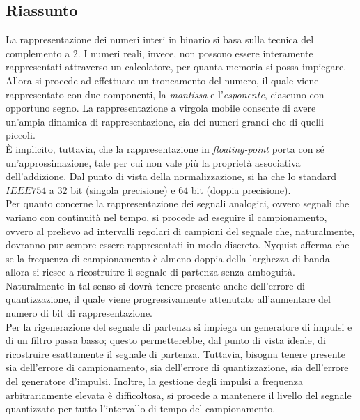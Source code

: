 \documentclass[a4paper]{extarticle}
\begin{document}
\subsection{Riassunto}
La rappresentazione dei numeri interi in binario si basa sulla tecnica del complemento a \(2\). I numeri reali, invece, non possono essere interamente rappresentati attraverso un calcolatore, per quanta memoria si possa impiegare. Allora si procede ad effettuare un troncamento del numero, il quale viene rappresentato con due componenti, la \textit{mantissa} e l'\textit{esponente}, ciascuno con opportuno segno. La rappresentazione a virgola mobile consente di avere un'ampia dinamica di rappresentazione, sia dei numeri grandi che di quelli piccoli.\\
È implicito, tuttavia, che la rappresentazione in \textit{floating-point} porta con sé un'approssimazione, tale per cui non vale più la proprietà associativa dell'addizione. Dal punto di vista della normalizzazione, si ha che lo standard \(IEEE 754\) a \(32\) bit (singola precisione) e \(64\) bit (doppia precisione).\\
Per quanto concerne la rappresentazione dei segnali analogici, ovvero segnali che variano con continuità nel tempo, si procede ad eseguire il campionamento, ovvero al prelievo ad intervalli regolari di campioni del segnale che, naturalmente, dovranno pur sempre essere rappresentati in modo discreto. Nyquist afferma che se la frequenza di campionamento è almeno doppia della larghezza di banda allora si riesce a ricostruitre il segnale di partenza senza amboguità. Naturalmente in tal senso si dovrà tenere presente anche dell'errore di quantizzazione, il quale viene progressivamente attenutato all'aumentare del numero di bit di rappresentazione.\\
Per la rigenerazione del segnale di partenza si impiega un generatore di impulsi e di un filtro passa basso; questo permetterebbe, dal punto di vista ideale, di ricostruire esattamente il segnale di partenza. Tuttavia, bisogna tenere presente sia dell'errore di campionamento, sia dell'errore di quantizzazione, sia dell'errore del generatore d'impulsi. Inoltre, la gestione degli impulsi a frequenza arbitrariamente elevata è difficoltosa, si procede a mantenere il livello del segnale quantizzato per tutto l'intervallo di tempo del campionamento.\\
\end{document}

